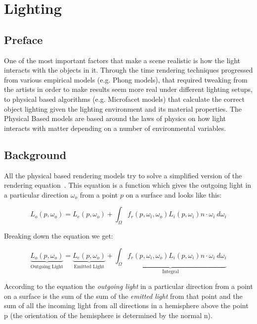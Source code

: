 \section{Lighting}
\subsection{Preface}
One of the most important factors that make a scene realistic is how the light interacts with the objects in it.
Through the time rendering techniques progressed from various empirical models (e.g. Phong models), that required
tweaking from the artists in order to make results seem more real under different lighting setups, to physical based
algorithms (e.g. Microfacet models) that calculate the correct object lighting given the lighting environment and
its material properties. The Physical Based models are based around the laws of physics on how light interacts with
matter depending on a number of environmental variables.

\subsection{Background}
All the physical based rendering models try to solve a simplified version of the rendering equation~\cite{lighting:ref32}.
This equation is a function which gives the outgoing light in a particular direction $\omega_o$ from a point $p$ on a surface
and looks like this:

\begin{equation}
\label{eq:rendeq}
L_o(p,\omega_o) = L_e(p, \omega_o) + \int_\Omega f_r(p,\omega_i,\omega_o)L_i(p,\omega_i)n\cdot\omega_i \ d\omega_i
\end{equation}

Breaking down the equation we get:

\begin{equation}
\underbrace{L_o(p,\omega_o)}_\text{Outgoing Light} = \underbrace{L_e(p, \omega_o)}_\text{Emitted Light} + \underbrace{\int_\Omega f_r(p,\omega_i,\omega_o)L_i(p,\omega_i)n\cdot\omega_i \ d\omega_i}_\text{Integral}
\end{equation}

According to the equation the \textit{outgoing light} in a particular direction from a point on a surface is the sum of the
sum of the \textit{emitted light} from that point and the sum of all the incoming light from all directions in a hemisphere
above the point p (the orientation of the hemisphere is determined by the normal n).

